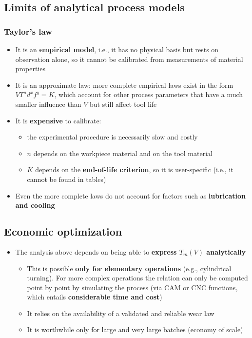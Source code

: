 \documentclass[
  letterpaper,
  DIV=11,
  numbers=noendperiod]{scrartcl}
\providecommand{\tightlist}{%
  \setlength{\itemsep}{0pt}\setlength{\parskip}{0pt}}
\begin{document}
\subsection{Limits of analytical process
models}\label{limits-of-analytical-process-models-1}

\subsubsection{Taylor's law}\label{taylors-law-1}

\begin{itemize}
\tightlist
\item
  It is an \textbf{empirical model}, i.e., it has no physical basis but
  rests on observation alone, so it cannot be calibrated from
  measurements of material properties
\item
  It is an approximate law: more complete empirical laws exist in the
  form \(VT^nd^xf^y=K\), which account for other process parameters that
  have a much smaller influence than \(V\) but still affect tool life
\item
  It is \textbf{expensive} to calibrate:

  \begin{itemize}
  \tightlist
  \item
    the experimental procedure is necessarily slow and costly
  \item
    \(n\) depends on the workpiece material and on the tool material
  \item
    \(K\) depends on the \textbf{end-of-life criterion}, so it is
    user-specific (i.e., it cannot be found in tables)
  \end{itemize}
\item
  Even the more complete laws do not account for factors such as
  \textbf{lubrication and cooling}
\end{itemize}

\subsection{Economic optimization}\label{economic-optimization}

\begin{itemize}
\tightlist
\item
  The analysis above depends on being able to \textbf{express \(T_m(V)\)
  analytically}

  \begin{itemize}
  \tightlist
  \item
    This is possible \textbf{only for elementary operations} (e.g.,
    cylindrical turning). For more complex operations the relation can
    only be computed point by point by simulating the process (via CAM
    or CNC functions, which entails \textbf{considerable time and cost})
  \item
    It relies on the availability of a validated and reliable wear law
  \item
    It is worthwhile only for large and very large batches (economy of
    scale)
  \end{itemize}
\end{itemize}
\end{document}
